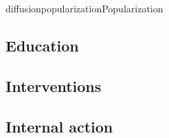 \documentclass{ra2018}
\begin{document}
\begin{module}{diffusion}{popularization}{Popularization}
\subsection{Education}

\subsection{Interventions}
      

\subsection{Internal action}


\end{module}
\end{document}
